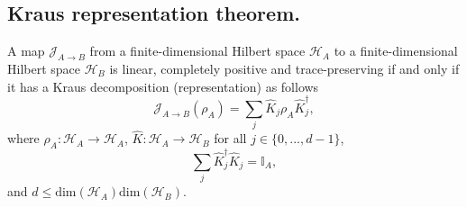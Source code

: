 \begin{appendix}
\subsection*{Kraus representation theorem.}
A map $\mathcal{J}_{A\rightarrow B}$ from a finite-dimensional Hilbert space $\mathcal{H}_{A}$ to a finite-dimensional Hilbert space $\mathcal{H}_{B}$ is linear, completely positive and trace-preserving if and only if it has a Kraus decomposition (representation) as follows\cite{Kraus}
\begin{equation}
\mathcal{J}_{A\rightarrow B}(\rho_{A})=\sum_{j}\hat{K}_{j}\rho_{A}\hat{K}_{j}^{\dagger},
\label{Kraustheorem}
\end{equation} 
where $\rho_{A}:\mathcal{H}_{A}\rightarrow\mathcal{H}_{A}$, $\hat{K}:\mathcal{H}_{A}\rightarrow\mathcal{H}_{B}$ for all $j\in \{0,...,d-1\}$,
\begin{equation}
\sum_{j}\hat{K}_{j}^{\dagger}\hat{K}_{j}=\mathbb{I}_{A},
\label{Krauscompleteness}
\end{equation}
and $d\leq\text{dim}(\mathcal{H}_{A})\text{dim}(\mathcal{H}_{B})$.

\end{appendix}
